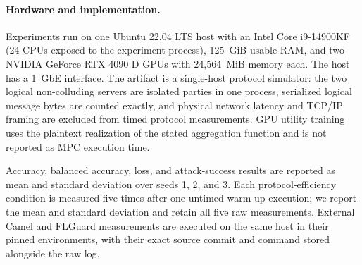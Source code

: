 \paragraph{Hardware and implementation.}
Experiments run on one Ubuntu 22.04 LTS host with an Intel Core i9-14900KF
(24 CPUs exposed to the experiment process), 125~GiB usable RAM, and two
NVIDIA GeForce RTX 4090 D GPUs with 24,564~MiB memory each. The host has a
1~GbE interface. The artifact is a single-host protocol simulator: the two
logical non-colluding servers are isolated parties in one process, serialized
logical message bytes are counted exactly, and physical network latency and
TCP/IP framing are excluded from timed protocol measurements. GPU utility
training uses the plaintext realization of the stated aggregation function and
is not reported as MPC execution time.

Accuracy, balanced accuracy, loss, and attack-success results are reported as
mean and standard deviation over seeds 1, 2, and 3. Each protocol-efficiency
condition is measured five times after one untimed warm-up execution; we report
the mean and standard deviation and retain all five raw measurements. External
Camel and FLGuard measurements are executed on the same host in their pinned
environments, with their exact source commit and command stored alongside the
raw log.
